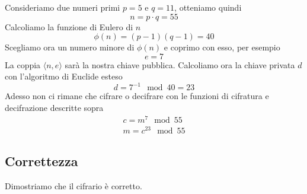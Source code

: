 \begin{example}
	Consideriamo due numeri primi $p = 5$ e $q = 11$, otteniamo quindi
	\[ n = p \cdot q = 55 \]
	Calcoliamo la funzione di Eulero di $n$
	\[ \phi(n) = (p - 1) (q - 1) = 40 \]
	Scegliamo ora un numero minore di $\phi(n)$ e coprimo con esso, per esempio
	\[ e = 7 \]
	La coppia $\langle n, e \rangle$ sar\`a la nostra chiave pubblica. Calcoliamo ora la chiave privata $d$ con
	l'algoritmo di Euclide esteso
	\[ d = 7^{-1} \mod{40} = 23 \]
	Adesso non ci rimane che cifrare o decifrare con le funzioni di cifratura e decifrazione descritte sopra
	\[
		\begin{matrix}
			c = m^7 \mod{55} \\
			m = c^{23} \mod{55}
		\end{matrix}
	\]
\end{example}

\subsection{Correttezza}
Dimostriamo che il cifrario \`e corretto.


